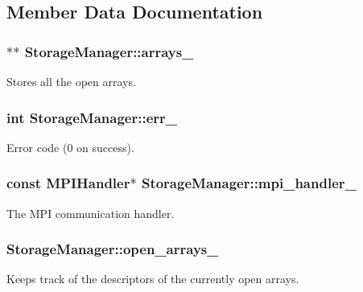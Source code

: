 \subsection{Member Data Documentation}
\hypertarget{classStorageManager_a3d34312ce7468b1c708c8a3bc5e2ea08}{}
\subsubsection[{arrays\+\_\+}]{$\ast$$\ast$ Storage\+Manager\+::arrays\+\_\+\hspace{0.3cm}{\ttfamily [private]}}\label{classStorageManager_a3d34312ce7468b1c708c8a3bc5e2ea08}
Stores all the open arrays. \hypertarget{classStorageManager_a3a36b5f640ef688962487bc1869b61e1}{}
\subsubsection[{err\+\_\+}]{\setlength{\rightskip}{0pt plus 5cm}int Storage\+Manager\+::err\+\_\+\hspace{0.3cm}{\ttfamily [private]}}\label{classStorageManager_a3a36b5f640ef688962487bc1869b61e1}
Error code (0 on success). \hypertarget{classStorageManager_af2070c85d3402bd1628d3d5fe7391c3e}{}
\subsubsection[{mpi\+\_\+handler\+\_\+}]{\setlength{\rightskip}{0pt plus 5cm}const {\bf M\+P\+I\+Handler}$\ast$ Storage\+Manager\+::mpi\+\_\+handler\+\_\+\hspace{0.3cm}{\ttfamily [private]}}\label{classStorageManager_af2070c85d3402bd1628d3d5fe7391c3e}
The M\+P\+I communication handler. \hypertarget{classStorageManager_a4f4d0447d153e3a33391d0663a63fdad}{}
\subsubsection[{open\+\_\+arrays\+\_\+}]{ Storage\+Manager\+::open\+\_\+arrays\+\_\+\hspace{0.3cm}{\ttfamily [private]}}\label{classStorageManager_a4f4d0447d153e3a33391d0663a63fdad}
Keeps track of the descriptors of the currently open arrays. \hypertarget{classStorageManager_ac1fa2414c2d99753a416eaa3e2794fdd}{}
